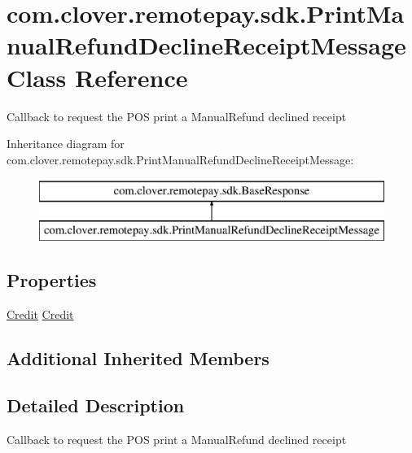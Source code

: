\hypertarget{classcom_1_1clover_1_1remotepay_1_1sdk_1_1_print_manual_refund_decline_receipt_message}{}\section{com.\+clover.\+remotepay.\+sdk.\+Print\+Manual\+Refund\+Decline\+Receipt\+Message Class Reference}
\label{classcom_1_1clover_1_1remotepay_1_1sdk_1_1_print_manual_refund_decline_receipt_message}


Callback to request the P\+OS print a Manual\+Refund declined receipt  


Inheritance diagram for com.\+clover.\+remotepay.\+sdk.\+Print\+Manual\+Refund\+Decline\+Receipt\+Message\+:\begin{figure}[H]
\begin{center}
\leavevmode
\includegraphics[height=2.000000cm]{classcom_1_1clover_1_1remotepay_1_1sdk_1_1_print_manual_refund_decline_receipt_message}
\end{center}
\end{figure}
\subsection*{Properties}
\begin{DoxyCompactItemize}
\item 
\hyperlink{classcom_1_1clover_1_1sdk_1_1v3_1_1payments_1_1_credit}{Credit} \hyperlink{classcom_1_1clover_1_1remotepay_1_1sdk_1_1_print_manual_refund_decline_receipt_message_a4122dfe89edab079126b51c3b23c9568}{Credit}
\end{DoxyCompactItemize}
\subsection*{Additional Inherited Members}


\subsection{Detailed Description}
Callback to request the P\+OS print a Manual\+Refund declined receipt 



